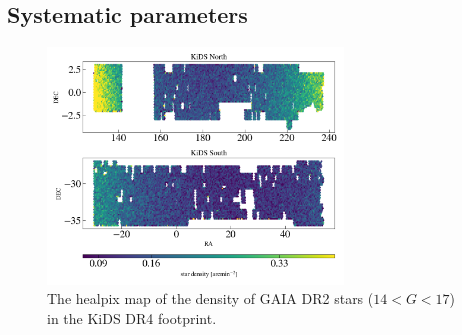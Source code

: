 \documentclass[fleqn,usenatbib,useAMS]{mnras}
\begin{document}
\subsection{Systematic parameters}

\begin{figure}
\includegraphics[width=0.7\textwidth, height = 0.5\textwidth]{figures_tmp/sys/scatter_nstar.png}
\caption{\label{fig:scatter_stardens} The healpix map of the density of GAIA DR2 stars ($14<G<17$) in the KiDS DR4 footprint.} 
\end{figure}
\end{document}

